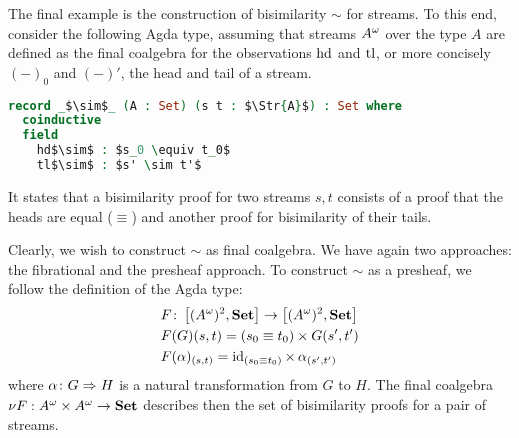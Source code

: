 \documentclass[runningheads,envcountsame,envcountsect,orivec]{llncs}
\begin{document}
\begin{example}[Bisimilarity]
  The final example is the construction of bisimilarity $\sim$ for streams.
  To this end, consider the following Agda type, assuming that streams
  ${A}^{\omega}$ over the type $A$ are defined as the final coalgebra for the
  observations $\operatorname{hd}$ and $\operatorname{tl}$, or more concisely $(-)_0$ and $(-)'$, the
  head and tail of a stream.
\begin{lstlisting}[language=Agda,mathescape=true,columns=flexible]
record _$\sim$_ (A : Set) (s t : $\Str{A}$) : Set where
  coinductive
  field
    hd$\sim$ : $s_0 \equiv t_0$
    tl$\sim$ : $s' \sim t'$
\end{lstlisting}
  It states that a bisimilarity proof for two streams $s,t$ consists of a proof
  that the heads are equal ($\equiv$) and another proof for bisimilarity of
  their tails.

  Clearly, we wish to construct $\sim$ as final coalgebra.
  We have again two approaches: the fibrational and the presheaf approach.
  To construct $\sim$ as a presheaf, we follow the definition of the Agda type:
  \begin{align*}
    & F \colon \left[ ({A}^{\omega})^2, \mathbf{Set} \right] \rightarrow \left[ ({A}^{\omega})^2, \mathbf{Set} \right] \\
    & F(G)(s,t) = (s_0 \equiv t_0) \times G(s',t') \\
    & F(\alpha)_{(s,t)} = \operatorname{id}_{(s_0 \equiv t_0)} \times \, \alpha_{(s',t')}
  \end{align*}
  where $\alpha \colon G \Rightarrow H$ is a natural transformation from $G$ to $H$.
  The final coalgebra $\nu F : {A}^{\omega} \times {A}^{\omega} \to \mathbf{Set}$ describes then
  the set of bisimilarity proofs for a pair of streams.


\end{example}
\end{document}
